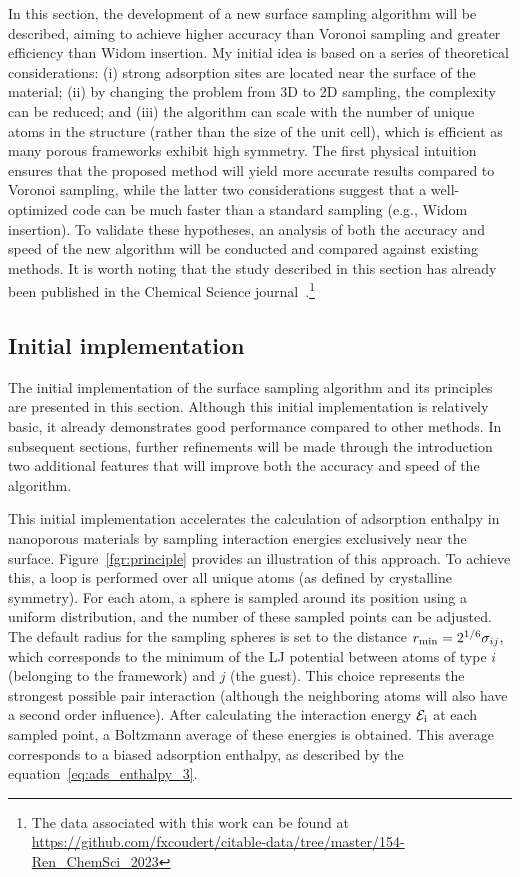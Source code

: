 \documentclass[main]{subfiles}
\begin{document}
In this section, the development of a new surface sampling algorithm will be described, aiming to achieve higher accuracy than Voronoi sampling and greater efficiency than Widom insertion. My initial idea is based on a series of theoretical considerations: (i) strong adsorption sites are located near the surface of the material; (ii) by changing the problem from 3D to 2D sampling, the complexity can be reduced; and (iii) the algorithm can scale with the number of unique atoms in the structure (rather than the size of the unit cell), which is efficient as many porous frameworks exhibit high symmetry. The first physical intuition ensures that the proposed method will yield more accurate results compared to Voronoi sampling, while the latter two considerations suggest that a well-optimized code can be much faster than a standard sampling (e.g., Widom insertion). To validate these hypotheses, an analysis of both the accuracy and speed of the new algorithm will be conducted and compared against existing methods. It is worth noting that the study described in this section has already been published in the Chemical Science journal~\cite{Ren_2022}.\footnote[1]{The data associated with this work can be found at \url{https://github.com/fxcoudert/citable-data/tree/master/154-Ren_ChemSci_2023}}

\subsection{Initial implementation}

The initial implementation of the surface sampling algorithm and its principles are presented in this section. Although this initial implementation is relatively basic, it already demonstrates good performance compared to other methods. In subsequent sections, further refinements will be made through the introduction two additional features that will improve both the accuracy and speed of the algorithm.

This initial implementation accelerates the calculation of adsorption enthalpy in nanoporous materials by sampling interaction energies exclusively near the surface. Figure~\ref{fgr:principle} provides an illustration of this approach. To achieve this, a loop is performed over all unique atoms (as defined by crystalline symmetry). For each atom, a sphere is sampled around its position using a uniform distribution, and the number of these sampled points can be adjusted. The default radius for the sampling spheres is set to the distance $r_{\text{min}}=2^{1/6}\sigma_{ij}$, which corresponds to the minimum of the LJ potential between atoms of type $i$ (belonging to the framework) and $j$ (the guest). This choice represents the strongest possible pair interaction (although the neighboring atoms will also have a second order influence). After calculating the interaction energy $\mathcal{E}_{\text{i}}$ at each sampled point, a Boltzmann average of these energies is obtained. This average corresponds to a biased adsorption enthalpy, as described by the equation~\ref{eq:ads_enthalpy_3}.
\end{document}
